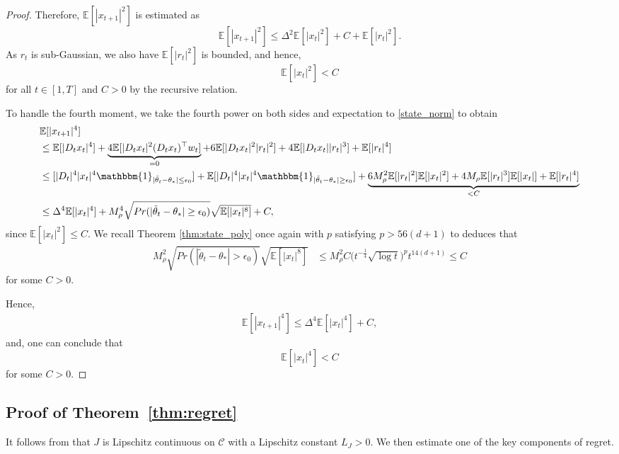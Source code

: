 \documentclass[11pt]{article}
\theoremstyle{plain}
\theoremstyle{definition}
\theoremstyle{remark}
\begin{document}
\begin{proof}
Therefore, $\mathbb{E}[|x_{t+1}|^2]$ is estimated as
\[
\mathbb{E}[|x_{t+1}|^2] \leq \Delta^2\mathbb{E}[|x_{t}|^2]+C+\mathbb{E}[|r_{t}|^2].
\]
As $r_t$ is sub-Gaussian, we also have $\mathbb{E}[|r_t|^2]$ is bounded, and hence, 
\[
\mathbb{E}[|x_{t}|^2] <C
\]
for all $t \in [1,T]$ and $C>0$ by the recursive relation.

To handle the fourth moment, we take the fourth power on both sides and expectation to \eqref{state_norm} to obtain
\begin{align*}
    &\mathbb{E}[|x_{t+1}|^4]\\
    &\leq \mathbb{E}[|D_{t}x_{t}|^4]+\underbrace{4\mathbb{E}[|D_{t}x_{t}|^2(D_{t}x_{t})^{\top}w_{t}]}_{=0}+6\mathbb{E}[|D_{t}x_{t}|^2|r_{t}|^2] +4\mathbb{E}[|D_{t}x_{t}||r_{t}|^3] + \mathbb{E}[|r_t|^4]\\
    &\leq [|D_{t}|^4|x_{t}|^4\mathbbm{1}_{|\tilde{\theta}_{t}-\theta_*| \leq \epsilon_0}]+\mathbb{E}[|D_{t}|^4|x_{t}|^4\mathbbm{1}_{|\tilde{\theta}_{t}-\theta_*| \geq \epsilon_0}]+\underbrace{6M_{\rho}^2\mathbb{E}[|r_{t}|^2]\mathbb{E}[|x_{t}|^2] +4M_{\rho}\mathbb{E}[|r_{t}|^3]\mathbb{E}[|x_{t}|]+  \mathbb{E}[|r_t|^4]}_{<C}\\
    & \leq \Delta^4\mathbb{E}[|x_{t}|^4]+M_{\rho}^4\sqrt{Pr(|\tilde{\theta}_{t}-\theta_*| \geq \epsilon_0)}\sqrt{\mathbb{E}[|x_{t}|^8]}+C,
\end{align*}
since $\mathbb{E}[|x_t|^2] \leq C$. We recall Theorem \ref{thm:state_poly} once again with $p$ satisfying $p>56(d+1)$ to deduces that
\begin{align*}
M_{\rho}^2\sqrt{Pr(|\tilde{\theta}_{t}-\theta_*|>\epsilon_0)}\sqrt{\mathbb{E}[|x_{t}|^8]}
    &\leq M_{\rho}^2C\bigg(t^{-\frac{1}{4}}\sqrt{\log t}\bigg)^pt^{14(d+1)} \leq C
\end{align*}
for some $C>0$. 

Hence,
\begin{align*}
    \mathbb{E}[|x_{t+1}|^4] \leq \Delta^4\mathbb{E}[|x_{t}|^4]+C,
\end{align*}
and, one can conclude that 
\[
\mathbb{E}[|x_{t}|^4] <C
\]
for some $C>0$.
\end{proof}

\subsection{Proof of Theorem~\ref{thm:regret}}\label{app:thm:regret}
It follows from \cite{abeille2017thompson} that $J$ is Lipschitz continuous on $\mathcal{C}$ with a Lipschitz constant $L_J > 0$. We then estimate one of the key components of regret.
\end{document}
